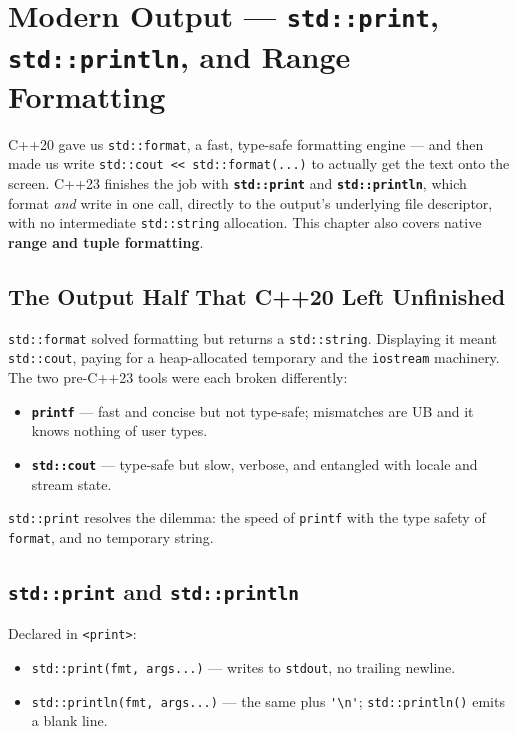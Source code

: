 \chapter{Modern Output --- \texttt{std::print}, \texttt{std::println}, and Range Formatting}
\label{ch:modern-output}

C++20 gave us \lstinline|std::format|, a fast, type-safe formatting engine --- and then made us write \lstinline|std::cout << std::format(...)| to actually get the text onto the screen. C++23 finishes the job with \textbf{\lstinline|std::print|} and \textbf{\lstinline|std::println|}, which format \emph{and} write in one call, directly to the output's underlying file descriptor, with no intermediate \lstinline|std::string| allocation. This chapter also covers native \textbf{range and tuple formatting}.

\section{The Output Half That C++20 Left Unfinished}

\lstinline|std::format| solved formatting but returns a \lstinline|std::string|. Displaying it meant \lstinline|std::cout|, paying for a heap-allocated temporary and the \lstinline|iostream| machinery. The two pre-C++23 tools were each broken differently:

\begin{itemize}
    \item \textbf{\lstinline|printf|} --- fast and concise but not type-safe; mismatches are UB and it knows nothing of user types.
    \item \textbf{\lstinline|std::cout|} --- type-safe but slow, verbose, and entangled with locale and stream state.
\end{itemize}

\lstinline|std::print| resolves the dilemma: the speed of \lstinline|printf| with the type safety of \lstinline|format|, and no temporary string.

\section{\texttt{std::print} and \texttt{std::println}}

Declared in \lstinline|<print>|:

\begin{itemize}
    \item \lstinline|std::print(fmt, args...)| --- writes to \lstinline|stdout|, no trailing newline.
    \item \lstinline|std::println(fmt, args...)| --- the same plus \lstinline|'\n'|; \lstinline|std::println()| emits a blank line.
\end{itemize}

